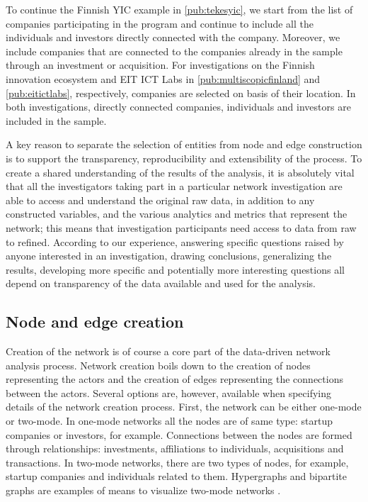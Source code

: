 To continue the Finnish YIC example in \ref{pub:tekesyic}, we start from the list of companies participating in the program and continue to include all the individuals and investors directly connected with the company. Moreover, we include companies that are connected to the companies already in the sample through an investment or acquisition. For investigations on the Finnish innovation ecosystem and EIT ICT Labs in \ref{pub:multiscopicfinland} and \ref{pub:eitictlabs}, respectively, companies are selected on basis of their location. In both investigations, directly connected companies, individuals and investors are included in the sample.

A key reason to separate the selection of entities from node and edge construction is to support the transparency, reproducibility and extensibility of the process. To create a shared understanding of the results of the analysis, it is absolutely vital that all the investigators taking part in a particular network investigation are able to access and understand the original raw data, in addition to any constructed variables, and the various analytics and metrics that represent the network; this means that investigation participants need access to data from raw to refined. According to our experience, answering specific questions raised by anyone interested in an investigation, drawing conclusions, generalizing the results, developing more specific and potentially more interesting questions all depend on transparency of the data available and used for the analysis.

\subsection{Node and edge creation}

Creation of the network is of course a core part of the data-driven network analysis process. Network creation boils down to the creation of nodes representing the actors and the creation of edges representing the connections between the actors. Several options are, however, available when specifying details of the network creation process. First, the network can be either one-mode or two-mode. In one-mode networks all the nodes are of same type: startup companies or investors, for example. Connections between the nodes are formed through relationships: investments, affiliations to individuals, acquisitions and transactions. In two-mode networks, there are two types of nodes, for example, startup companies and individuals related to them. Hypergraphs and bipartite graphs are examples of means to visualize two-mode networks \citep{Jesus2009,Freeman2009MethodsVisualization}.

